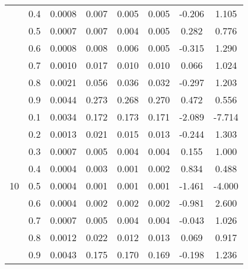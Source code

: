 \documentclass[11pt,a4paper]{report}
\begin{document}
\begin{longtable}{ | c | c || c | c | c | c | c | c | }
 & 0.4 & 0.0008 & 0.007 & 0.005 & 0.005 & -0.206 & 1.105 \\
 & 0.5 & 0.0007 & 0.007 & 0.004 & 0.005 & 0.282 & 0.776 \\
 & 0.6 & 0.0008 & 0.008 & 0.006 & 0.005 & -0.315 & 1.290 \\
 & 0.7 & 0.0010 & 0.017 & 0.010 & 0.010 & 0.066 & 1.024 \\
 & 0.8 & 0.0021 & 0.056 & 0.036 & 0.032 & -0.297 & 1.203 \\
 & 0.9 & 0.0044 & 0.273 & 0.268 & 0.270 & 0.472 & 0.556 \\
 \hline
\multirow{9}{*}{10} & 0.1 & 0.0034 & 0.172 & 0.173 & 0.171 & -2.089 & -7.714 \\
 & 0.2 & 0.0013 & 0.021 & 0.015 & 0.013 & -0.244 & 1.303 \\
 & 0.3 & 0.0007 & 0.005 & 0.004 & 0.004 & 0.155 & 1.000 \\
 & 0.4 & 0.0004 & 0.003 & 0.001 & 0.002 & 0.834 & 0.488 \\
 & 0.5 & 0.0004 & 0.001 & 0.001 & 0.001 & -1.461 & -4.000 \\
 & 0.6 & 0.0004 & 0.002 & 0.002 & 0.002 & -0.981 & 2.600 \\
 & 0.7 & 0.0007 & 0.005 & 0.004 & 0.004 & -0.043 & 1.026 \\
 & 0.8 & 0.0012 & 0.022 & 0.012 & 0.013 & 0.069 & 0.917 \\
 & 0.9 & 0.0043 & 0.175 & 0.170 & 0.169 & -0.198 & 1.236 \\
 \hline
\hline
\end{longtable}
\end{document}
